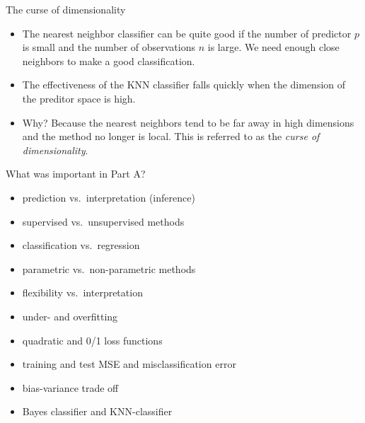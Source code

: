 \documentclass[ignorenonframetext,]{beamer}
\providecommand{\tightlist}{%
  \setlength{\itemsep}{0pt}\setlength{\parskip}{0pt}}
\begin{document}
\begin{frame}

\begin{block}{The curse of dimensionality}

\begin{itemize}
\item
  The nearest neighbor classifier can be quite good if the number of
  predictor \(p\) is small and the number of observations \(n\) is
  large. We need enough close neighbors to make a good classification.
\item
  The effectiveness of the KNN classifier falls quickly when the
  dimension of the preditor space is high.
\item
  Why? Because the nearest neighbors tend to be far away in high
  dimensions and the method no longer is local. This is referred to as
  the \emph{curse of dimensionality}.
\end{itemize}

\end{block}

\end{frame}

\begin{frame}

\begin{block}{What was important in Part A?}

\begin{itemize}
\tightlist
\item
  prediction vs.~interpretation (inference)
\item
  supervised vs.~unsupervised methods
\item
  classification vs.~regression
\item
  parametric vs.~non-parametric methods
\item
  flexibility vs.~interpretation
\item
  under- and overfitting
\item
  quadratic and 0/1 loss functions
\item
  training and test MSE and misclassification error
\item
  bias-variance trade off
\item
  Bayes classifier and KNN-classifier
\end{itemize}

\end{block}

\end{frame}
\end{document}
